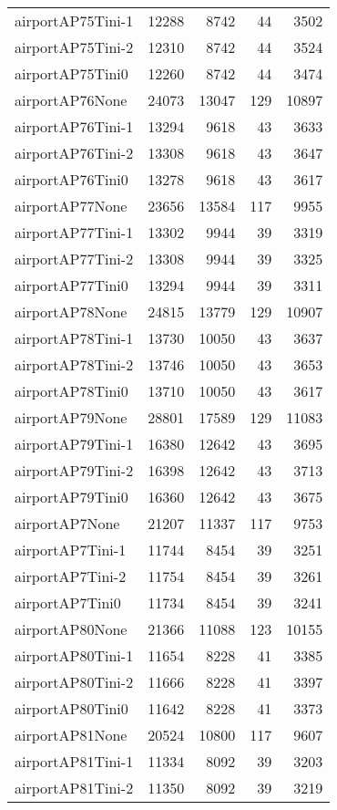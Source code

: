 \begin{longtable}{lrrrr}
airportAP75Tini-1 & 12288 & 8742 & 44 & 3502 \\
airportAP75Tini-2 & 12310 & 8742 & 44 & 3524 \\
airportAP75Tini0 & 12260 & 8742 & 44 & 3474 \\
airportAP76None & 24073 & 13047 & 129 & 10897 \\
airportAP76Tini-1 & 13294 & 9618 & 43 & 3633 \\
airportAP76Tini-2 & 13308 & 9618 & 43 & 3647 \\
airportAP76Tini0 & 13278 & 9618 & 43 & 3617 \\
airportAP77None & 23656 & 13584 & 117 & 9955 \\
airportAP77Tini-1 & 13302 & 9944 & 39 & 3319 \\
airportAP77Tini-2 & 13308 & 9944 & 39 & 3325 \\
airportAP77Tini0 & 13294 & 9944 & 39 & 3311 \\
airportAP78None & 24815 & 13779 & 129 & 10907 \\
airportAP78Tini-1 & 13730 & 10050 & 43 & 3637 \\
airportAP78Tini-2 & 13746 & 10050 & 43 & 3653 \\
airportAP78Tini0 & 13710 & 10050 & 43 & 3617 \\
airportAP79None & 28801 & 17589 & 129 & 11083 \\
airportAP79Tini-1 & 16380 & 12642 & 43 & 3695 \\
airportAP79Tini-2 & 16398 & 12642 & 43 & 3713 \\
airportAP79Tini0 & 16360 & 12642 & 43 & 3675 \\
airportAP7None & 21207 & 11337 & 117 & 9753 \\
airportAP7Tini-1 & 11744 & 8454 & 39 & 3251 \\
airportAP7Tini-2 & 11754 & 8454 & 39 & 3261 \\
airportAP7Tini0 & 11734 & 8454 & 39 & 3241 \\
airportAP80None & 21366 & 11088 & 123 & 10155 \\
airportAP80Tini-1 & 11654 & 8228 & 41 & 3385 \\
airportAP80Tini-2 & 11666 & 8228 & 41 & 3397 \\
airportAP80Tini0 & 11642 & 8228 & 41 & 3373 \\
airportAP81None & 20524 & 10800 & 117 & 9607 \\
airportAP81Tini-1 & 11334 & 8092 & 39 & 3203 \\
airportAP81Tini-2 & 11350 & 8092 & 39 & 3219 \\

\end{longtable}
